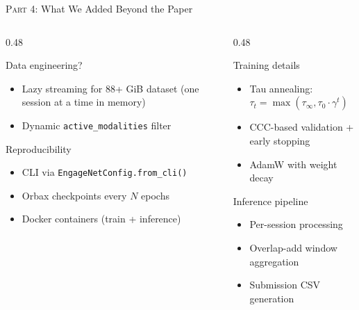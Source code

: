 \documentclass[aspectratio=169]{beamer}
\begin{document}
	\begin{frame}{\textsc{Part 4:} What We Added Beyond the Paper}
		\begin{columns}[onlytextwidth]
			\begin{column}{0.48\textwidth}
				\begin{block}{Data engineering?}
					\small
					\begin{itemize}
						\item Lazy streaming for 88+ GiB dataset (one session at a time in memory)
						\item Dynamic \texttt{active\_modalities} filter
					\end{itemize}
				\end{block}
				\begin{block}{Reproducibility}
					\small
					\begin{itemize}
						\item CLI via \texttt{EngageNetConfig.from\_cli()}
						\item Orbax checkpoints every $N$ epochs
						\item Docker containers (train + inference)
					\end{itemize}
				\end{block}
			\end{column}
			\begin{column}{0.48\textwidth}
				\begin{block}{Training details}
					\small
					\begin{itemize}
						\item Tau annealing: $\tau_t = \max(\tau_\infty, \tau_0 \cdot \gamma^t)$
						\item CCC-based validation + early stopping
						\item AdamW with weight decay
					\end{itemize}
				\end{block}
				\begin{block}{Inference pipeline}
					\small
					\begin{itemize}
						\item Per-session processing
						\item Overlap-add window aggregation
						\item Submission CSV generation
					\end{itemize}
				\end{block}
			\end{column}
		\end{columns}
	\end{frame}
\end{document}
